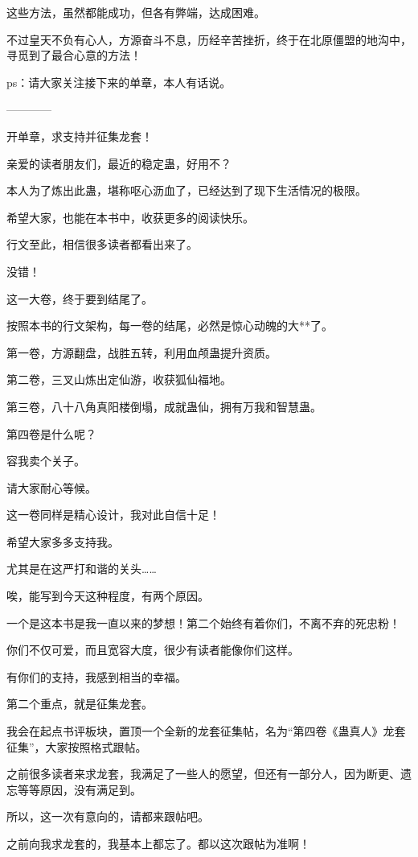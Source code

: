 \begin{this_body}
这些方法，虽然都能成功，但各有弊端，达成困难。

不过皇天不负有心人，方源奋斗不息，历经辛苦挫折，终于在北原僵盟的地沟中，寻觅到了最合心意的方法！

ps：请大家关注接下来的单章，本人有话说。

------------

开单章，求支持并征集龙套！

亲爱的读者朋友们，最近的稳定蛊，好用不？

本人为了炼出此蛊，堪称呕心沥血了，已经达到了现下生活情况的极限。

希望大家，也能在本书中，收获更多的阅读快乐。

行文至此，相信很多读者都看出来了。

没错！

这一大卷，终于要到结尾了。

按照本书的行文架构，每一卷的结尾，必然是惊心动魄的大**了。

第一卷，方源翻盘，战胜五转，利用血颅蛊提升资质。

第二卷，三叉山炼出定仙游，收获狐仙福地。

第三卷，八十八角真阳楼倒塌，成就蛊仙，拥有万我和智慧蛊。

第四卷是什么呢？

容我卖个关子。

请大家耐心等候。

这一卷同样是精心设计，我对此自信十足！

希望大家多多支持我。

尤其是在这严打和谐的关头……

唉，能写到今天这种程度，有两个原因。

一个是这本书是我一直以来的梦想！第二个始终有着你们，不离不弃的死忠粉！

你们不仅可爱，而且宽容大度，很少有读者能像你们这样。

有你们的支持，我感到相当的幸福。

第二个重点，就是征集龙套。

我会在起点书评板块，置顶一个全新的龙套征集帖，名为“第四卷《蛊真人》龙套征集”，大家按照格式跟帖。

之前很多读者来求龙套，我满足了一些人的愿望，但还有一部分人，因为断更、遗忘等等原因，没有满足到。

所以，这一次有意向的，请都来跟帖吧。

之前向我求龙套的，我基本上都忘了。都以这次跟帖为准啊！

\end{this_body}

